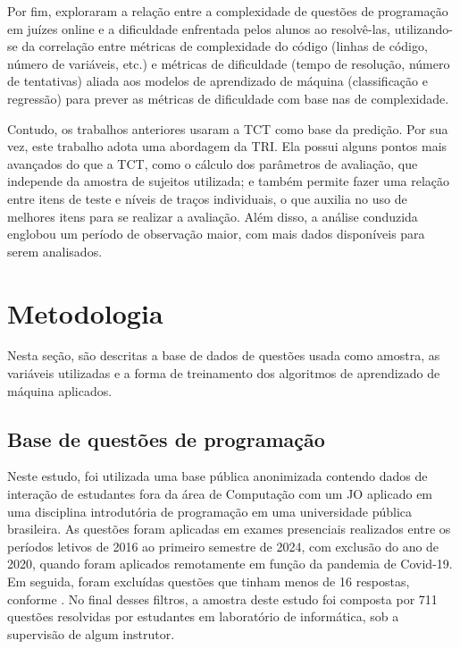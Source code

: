 \documentclass[12pt]{article}
\begin{document}
Por fim, \cite{jackson2023} exploraram a relação entre a complexidade de questões de programação em juízes online e a dificuldade enfrentada pelos alunos ao resolvê-las, utilizando-se da correlação entre métricas de complexidade do código (linhas de código, número de variáveis, etc.) e métricas de dificuldade (tempo de resolução, número de tentativas) aliada aos modelos de aprendizado de máquina (classificação e regressão) para prever as métricas de dificuldade com base nas de complexidade.

Contudo, os trabalhos anteriores usaram a TCT como base da predição. Por sua vez, este trabalho adota uma abordagem da TRI. Ela possui alguns pontos mais avançados do que a TCT, como o cálculo dos parâmetros de avaliação, que independe da amostra de sujeitos utilizada; e também permite fazer uma relação entre itens de teste e níveis de traços individuais, o que auxilia no uso de melhores itens para se realizar a avaliação. Além disso, a análise conduzida englobou um período de observação maior, com mais dados disponíveis para serem analisados.

\section{Metodologia}

Nesta seção, são descritas a base de dados de questões usada como amostra, as variáveis utilizadas e a forma de treinamento dos algoritmos de aprendizado de máquina aplicados.

\subsection{Base de questões de programação}

Neste estudo, foi utilizada uma base pública anonimizada contendo dados de interação de estudantes fora da área de Computação com um JO aplicado em uma disciplina introdutória de programação em uma universidade pública brasileira. As questões foram aplicadas em exames presenciais realizados entre os períodos letivos de 2016 ao primeiro semestre de 2024, com exclusão do ano de 2020, quando foram aplicados remotamente em função da pandemia de Covid-19. Em seguida, foram excluídas questões que tinham menos de 16  respostas, conforme \cite{marcos2021}. No final desses filtros, a amostra deste estudo foi composta por 711 questões resolvidas por estudantes em laboratório de informática, sob a supervisão de algum instrutor.
\end{document}
